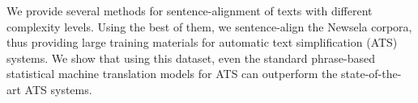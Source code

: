 We provide several methods for sentence-alignment of texts with different complexity levels. Using the best of them, we sentence-align the Newsela corpora, thus providing large training materials for automatic text simplification (ATS) systems. We show that using this dataset, even the standard phrase-based statistical machine translation models for ATS can outperform the state-of-the-art ATS systems.
